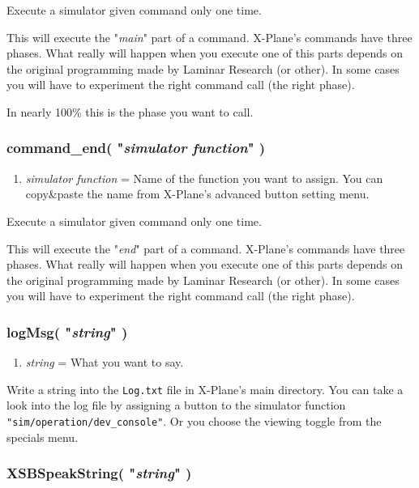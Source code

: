 \documentclass[11pt,parskip=half,a4paper]{scrartcl}
\begin{document}
Execute a simulator given command only one time.

This will execute the "\emph{main}" part of a command. X-Plane's commands have three phases. What really will happen when you execute one of this parts depends on the original programming made by Laminar Research  (or other). In some cases you will have to experiment the right command call (the right phase).

In nearly 100\% this is the phase you want to call.

\subsubsection{command\_end( "\emph{simulator function}" )}

\begin{enumerate}
	\item \emph{simulator function} = Name of the function you want to assign. You can copy\&paste the name from X-Plane's advanced button setting menu.
\end{enumerate}

Execute a simulator given command only one time.

This will execute the "\emph{end}" part of a command. X-Plane's commands have three phases. What really will happen when you execute one of this parts depends on the original programming made by Laminar Research  (or other). In some cases you will have to experiment the right command call (the right phase).

\subsubsection{logMsg( "\emph{string}" )}

\begin{enumerate}
	\item \emph{string} = What you want to say.
\end{enumerate}

Write a string into the \verb|Log.txt| file in X-Plane's main directory. You can take a look into the log file by assigning a button to the simulator function \verb|"sim/operation/dev_console"|. Or you choose the viewing toggle from the specials menu.

\subsubsection{XSBSpeakString( "\emph{string}" )}
\end{document}
